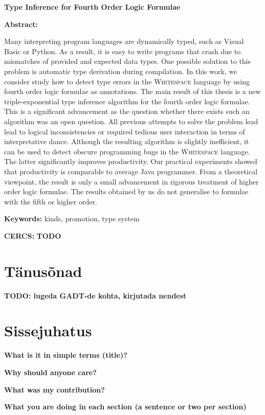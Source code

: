 \documentclass[12pt]{article}
\newcommand\peatykk[1]{
  \clearpage
  \section{#1}}
\newcommand\peatykktarn[1]{
  \clearpage
  \section*{#1}
  \addcontentsline{toc}{section}{#1}}
\newcommand\markus[1]{\textcolor{roheline}{\textbf{#1}}}
\begin{document}
{
\noindent
\textbf{\large Type Inference for Fourth Order Logic Formulae}

\vspace*{3ex}

\noindent
\textbf{Abstract:}

\noindent
Many interpreting program languages are dynamically typed, such as Visual Basic or Python. As a result, it is easy to write programs that crash due to mismatches of provided and expected data types.  One possible solution to this problem is automatic type derivation during compilation. In this work, we consider study how to detect type errors in the \textsc{Whitespace} language by using fourth order logic formulae as annotations. The main result of this thesis is a new triple-exponential type inference algorithm for the fourth order logic formulae. This is a significant advancement as the question whether there exists such an algorithm was an open question. 
All previous attempts to solve the problem lead lead to logical inconsistencies or required tedious user interaction in terms of interpretative dance. Although the resulting algorithm is slightly inefficient, it can be used to detect obscure programming bugs in the \textsc{Whitespace} language. The latter significantly improves productivity. Our practical experiments showed that productivity is comparable to average Java programmer.   
From a theoretical viewpoint, the result is only a small advancement in rigorous treatment of higher order logic formulae. The results obtained by us do not generalise to formulae with the fifth or higher order. 

\vspace*{1ex}

\noindent
\textbf{Keywords:} kinds, promotion, type system

\vspace*{1ex}

\noindent
\textbf{CERCS:} \markus{TODO}

\vspace*{1ex}
}
\newpage
  \tableofcontents
  \peatykktarn{Tänusõnad}
    \markus{TODO: lugeda GADT-de kohta, kirjutada nendest}
  \peatykk{Sissejuhatus}
    \markus{What is it in simple terms (title)?}

    \markus{Why should anyone care?}

    \markus{What was my contribution?}

    \markus{What you are doing in each section (a sentence or two per section)}
\end{document}
